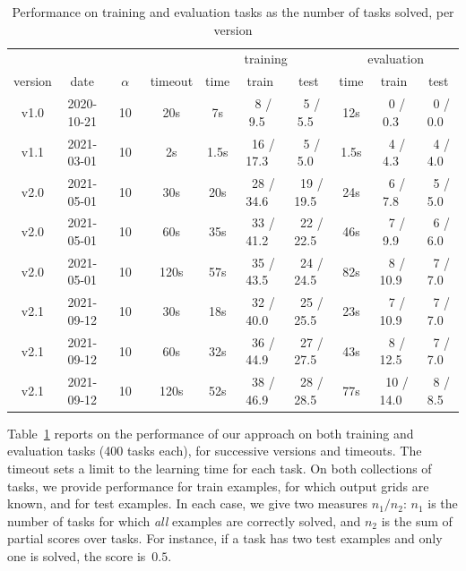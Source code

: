 \documentclass[a4paper]{llncs}
\begin{document}
\begin{table}[t]
  \centering
  \caption{Performance on training and evaluation tasks as the number of tasks solved, per version}
  \begin{tabular}{|c|c|c|c|c|c|c|c|c|c|}
    \hline
     & & & & \multicolumn{3}{c|}{training} & \multicolumn{3}{c|}{evaluation} \\
    version & date & $\alpha$ & timeout & time & train & test & time & train & test \\
    \hline
    v1.0 & 2020-10-21 & ~10~ & 20s & 7s & ~8 / 9.5~ & ~5 / 5.5~ & 12s & ~0 / 0.3~ & ~0 / 0.0~ \\
    \hline
    v1.1 & 2021-03-01 & ~10~ & 2s & 1.5s & ~16 / 17.3~ & ~5 / 5.0~ & 1.5s & ~4 / 4.3~ & ~4 / 4.0~ \\
    \hline
    v2.0 & 2021-05-01 & ~10~ & 30s & 20s & ~28 / 34.6~ & ~19 / 19.5~ & 24s & ~6 / 7.8~  & ~5 / 5.0~ \\
    v2.0 & 2021-05-01 & ~10~ & 60s & 35s & ~33 / 41.2~ & ~22 / 22.5~ & 46s & ~7 / 9.9~ & ~6 / 6.0~ \\
    v2.0 & 2021-05-01 & ~10~ & 120s & 57s & ~35 / 43.5~ & ~24 / 24.5~ & 82s & ~8 / 10.9~ & ~7 / 7.0~ \\
    \hline
    v2.1 & 2021-09-12 & ~10~ & 30s & 18s & ~32 / 40.0~ & ~25 / 25.5~ & 23s & ~7 / 10.9~ & ~7 / 7.0~ \\
    v2.1 & 2021-09-12 & ~10~ & 60s & 32s & ~36 / 44.9~ & ~27 / 27.5~ & 43s & ~8 / 12.5~ & ~7 / 7.0~ \\
    v2.1 & 2021-09-12 & ~10~ & 120s & 52s & ~38 / 46.9~ & ~28 / 28.5~ & 77s & ~10 / 14.0~ & ~8 / 8.5~ \\
    \hline
  \end{tabular}
  \label{tab:eval}
\end{table}

Table~\ref{tab:eval} reports on the performance of our approach on
both training and evaluation tasks (400 tasks each), for successive
versions and timeouts. The timeout sets a limit to the learning time
for each task. On both collections of tasks, we provide performance
for train examples, for which output grids are known, and for test
examples. In each case, we give two measures $n_1/n_2$: $n_1$ is the
number of tasks for which {\em all} examples are correctly solved, and
$n_2$ is the sum of partial scores over tasks. For instance, if a task
has two test examples and only one is solved, the score is~$0.5$.
\end{document}
